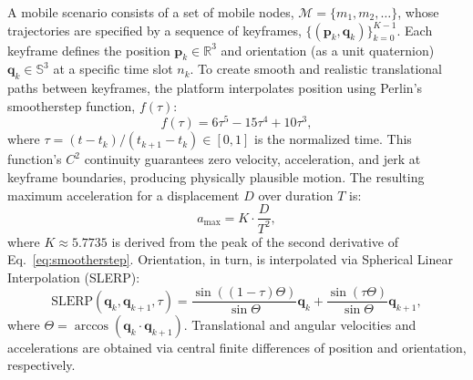 \documentclass[fleqn,10pt]{wlscirep}
\begin{document}
A mobile scenario consists of a set of mobile nodes, $\mathcal{M} = \{m_1, m_2, \dots\}$, whose trajectories are specified by a sequence of keyframes, $\{(\mathbf{p}_k, \mathbf{q}_k)\}_{k=0}^{K-1}$. Each keyframe defines the position $\mathbf{p}_k \in \mathbb{R}^3$ and orientation (as a unit quaternion) $\mathbf{q}_k \in \mathbb{S}^3$ at a specific time slot $n_k$. To create smooth and realistic translational paths between keyframes, the platform interpolates position using Perlin's smootherstep function\cite{Perlin2002}, $f(\tau)$:
\begin{equation}
f(\tau) = 6\tau^5 - 15\tau^4 + 10\tau^3,
\label{eq:smootherstep}
\end{equation}
where $\tau = (t - t_k) / (t_{k+1} - t_k) \in [0, 1]$ is the normalized time. This function's $C^2$ continuity guarantees zero velocity, acceleration, and jerk at keyframe boundaries, producing physically plausible motion. The resulting maximum acceleration for a displacement $D$ over duration $T$ is:
\begin{equation}
    a_{\max} = K \cdot \frac{D}{T^2},
\end{equation}
where $K \approx 5.7735$ is derived from the peak of the second derivative of Eq.~\eqref{eq:smootherstep}. Orientation, in turn, is interpolated via Spherical Linear Interpolation (SLERP):
\begin{equation}
    \text{SLERP}(\mathbf{q}_k, \mathbf{q}_{k+1}, \tau) = \frac{\sin((1-\tau)\Theta)}{\sin\Theta}\mathbf{q}_k + \frac{\sin(\tau\Theta)}{\sin\Theta}\mathbf{q}_{k+1},
\end{equation}
where $\Theta = \arccos(\mathbf{q}_k \cdot \mathbf{q}_{k+1})$. Translational and angular velocities and accelerations are obtained via central finite differences of position and orientation, respectively.
\end{document}
